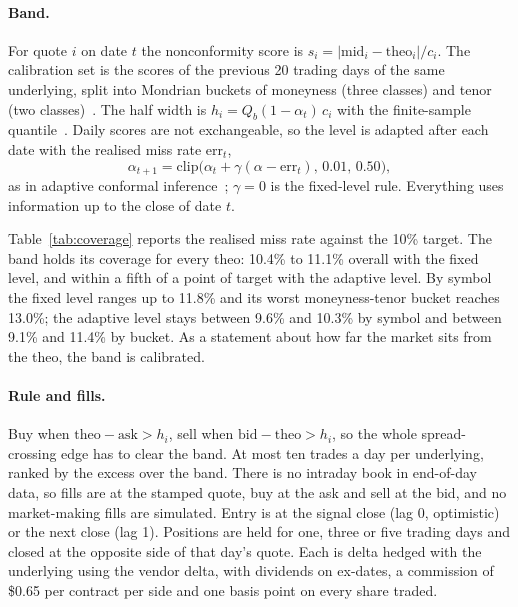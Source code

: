 \documentclass[11pt]{article}
\begin{document}
\paragraph{Band.}
For quote $i$ on date $t$ the nonconformity score is $s_i=|\mathrm{mid}_i-\mathrm{theo}_i|/c_i$. The calibration set is the scores of the previous 20 trading days of the same underlying, split into Mondrian buckets of moneyness (three classes) and tenor (two classes)~\cite{bostrom2020mondrian}. The half width is $h_i=Q_b(1-\alpha_t)\,c_i$ with the finite-sample quantile~\cite{vovk2005algorithmic,lei2018distribution}. Daily scores are not exchangeable, so the level is adapted after each date with the realised miss rate $\mathrm{err}_t$,
\begin{equation}
\alpha_{t+1}=\mathrm{clip}\bigl(\alpha_t+\gamma(\alpha-\mathrm{err}_t),\,0.01,\,0.50\bigr),
\label{eq:aci}
\end{equation}
as in adaptive conformal inference~\cite{gibbs2021adaptive}; $\gamma=0$ is the fixed-level rule. Everything uses information up to the close of date $t$.

Table~\ref{tab:coverage} reports the realised miss rate against the 10\% target. The band holds its coverage for every theo: 10.4\% to 11.1\% overall with the fixed level, and within a fifth of a point of target with the adaptive level. By symbol the fixed level ranges up to 11.8\% and its worst moneyness-tenor bucket reaches 13.0\%; the adaptive level stays between 9.6\% and 10.3\% by symbol and between 9.1\% and 11.4\% by bucket. As a statement about how far the market sits from the theo, the band is calibrated.

\paragraph{Rule and fills.}
Buy when $\mathrm{theo}-\mathrm{ask}>h_i$, sell when $\mathrm{bid}-\mathrm{theo}>h_i$, so the whole spread-crossing edge has to clear the band. At most ten trades a day per underlying, ranked by the excess over the band. There is no intraday book in end-of-day data, so fills are at the stamped quote, buy at the ask and sell at the bid, and no market-making fills are simulated. Entry is at the signal close (lag 0, optimistic) or the next close (lag 1). Positions are held for one, three or five trading days and closed at the opposite side of that day's quote. Each is delta hedged with the underlying using the vendor delta, with dividends on ex-dates, a commission of \$0.65 per contract per side and one basis point on every share traded.
\end{document}
